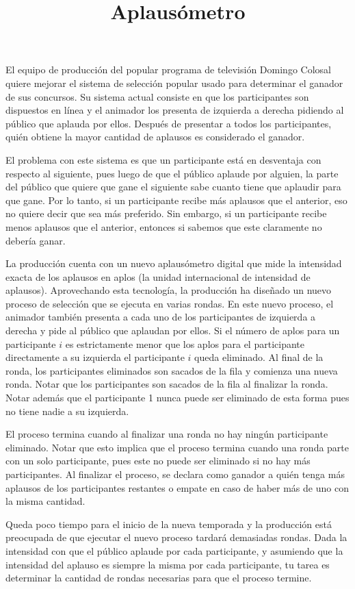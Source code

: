 \documentclass{oci}
\title{Aplausómetro}
\begin{document}
\begin{problemDescription}
El equipo de producción del popular programa de televisión
Domingo Colosal quiere mejorar el sistema de selección
popular usado para determinar el ganador de sus concursos.
%
Su sistema actual consiste en que los participantes
son dispuestos en línea y el animador los presenta de
izquierda a derecha pidiendo al público que aplauda por ellos.
%
Después de presentar a todos los participantes, quién obtiene
la mayor cantidad de aplausos es considerado el ganador.

El problema con este sistema es que
un participante está en desventaja con respecto
al siguiente, pues luego de que el público aplaude por
alguien, la parte del público que quiere que gane el siguiente
sabe cuanto tiene que aplaudir para que gane.
%
Por lo tanto, si un participante recibe más aplausos
que el anterior, eso no quiere decir que sea más preferido.
%
Sin embargo, si un participante recibe menos aplausos
que el anterior, entonces si sabemos que este claramente
no debería ganar.

La producción cuenta con un nuevo aplausómetro digital
que mide la intensidad exacta de los aplausos en aplos
(la unidad internacional de intensidad de aplausos).
%
Aprovechando esta tecnología, la producción ha diseñado
un nuevo proceso de selección que se ejecuta en varias rondas.
%
En este nuevo proceso, el animador también presenta a cada uno
de los participantes de izquierda a derecha y pide al público
que aplaudan por ellos.
%
Si el número de aplos para un participante $i$ es estrictamente
menor que los aplos para el participante directamente a
su izquierda el participante $i$ queda eliminado.
%
Al final de la ronda, los participantes eliminados son sacados
de la fila y comienza una nueva ronda.
%
Notar que los participantes son sacados de la fila al finalizar
la ronda.
%
Notar además que el participante 1 nunca puede ser eliminado
de esta forma pues no tiene nadie a su izquierda.

El proceso termina cuando al finalizar una ronda
no hay ningún participante eliminado.
%
Notar que esto implica que el proceso termina cuando una
ronda parte con un solo participante, pues este no puede
ser eliminado si no hay más participantes.
%
Al finalizar el proceso, se declara como ganador a quién
tenga más aplausos de los participantes restantes o empate
en caso de haber más de uno con la misma cantidad.

Queda poco tiempo para el inicio de la nueva temporada
y la producción está preocupada de que ejecutar el nuevo proceso
tardará demasiadas rondas.
%
Dada la intensidad con que el público aplaude por cada participante,
y asumiendo que la intensidad del aplauso es siempre la misma por
cada participante, tu tarea es determinar la cantidad de rondas
necesarias para que el proceso termine.
\end{problemDescription}
\end{document}

